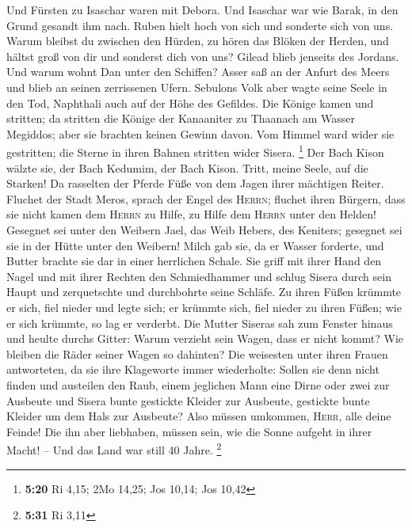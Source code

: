  Und Fürsten zu Isaschar waren mit Debora. Und Isaschar
war wie Barak, in den Grund gesandt ihm nach. Ruben hielt hoch von sich
und sonderte sich von uns.  Warum bleibst du zwischen den
Hürden, zu hören das Blöken der Herden, und hältst groß von dir und
sonderst dich von uns?  Gilead blieb jenseits des
Jordans. Und warum wohnt Dan unter den Schiffen? Asser saß an der Anfurt
des Meers und blieb an seinen zerrissenen Ufern. 
Sebulons Volk aber wagte seine Seele in den Tod, Naphthali auch auf der
Höhe des Gefildes.  Die Könige kamen und stritten; da
stritten die Könige der Kanaaniter zu Thaanach am Wasser Megiddos; aber
sie brachten keinen Gewinn davon.  Vom Himmel ward wider
sie gestritten; die Sterne in ihren Bahnen stritten wider Sisera.
\footnote{\textbf{5:20} Ri 4,15; 2Mo 14,25; Jos 10,14; Jos 10,42}
 Der Bach Kison wälzte sie, der Bach Kedumim, der Bach
Kison. Tritt, meine Seele, auf die Starken!  Da rasselten
der Pferde Füße von dem Jagen ihrer mächtigen Reiter. 
Fluchet der Stadt Meros, sprach der Engel des \textsc{Herrn}; fluchet
ihren Bürgern, dass sie nicht kamen dem \textsc{Herrn} zu Hilfe, zu
Hilfe dem \textsc{Herrn} unter den Helden!  Gesegnet sei
unter den Weibern Jael, das Weib Hebers, des Keniters; gesegnet sei sie
in der Hütte unter den Weibern!  Milch gab sie, da er
Wasser forderte, und Butter brachte sie dar in einer herrlichen Schale.
 Sie griff mit ihrer Hand den Nagel und mit ihrer Rechten
den Schmiedhammer und schlug Sisera durch sein Haupt und zerquetschte
und durchbohrte seine Schläfe.  Zu ihren Füßen krümmte er
sich, fiel nieder und legte sich; er krümmte sich, fiel nieder zu ihren
Füßen; wie er sich krümmte, so lag er verderbt.  Die
Mutter Siseras sah zum Fenster hinaus und heulte durchs Gitter: Warum
verzieht sein Wagen, dass er nicht kommt? Wie bleiben die Räder seiner
Wagen so dahinten?  Die weisesten unter ihren Frauen
antworteten, da sie ihre Klageworte immer wiederholte: 
Sollen sie denn nicht finden und austeilen den Raub, einem jeglichen
Mann eine Dirne oder zwei zur Ausbeute und Sisera bunte gestickte
Kleider zur Ausbeute, gestickte bunte Kleider um dem Hals zur Ausbeute?
 Also müssen umkommen, \textsc{Herr}, alle deine Feinde!
Die ihn aber liebhaben, müssen sein, wie die Sonne aufgeht in ihrer
Macht! -- Und das Land war still 40 Jahre. \footnote{\textbf{5:31} Ri
  3,11}

